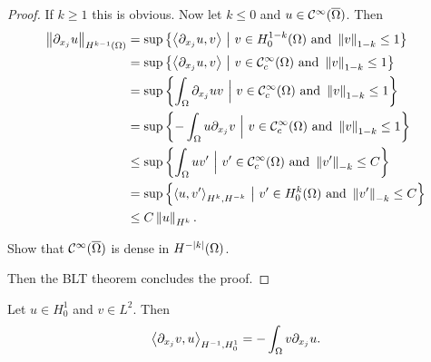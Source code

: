 \begin{proof}
  If $k\geq1$ this is obvious.
  Now let $k\leq0$ and $u\in\mathcal{C}^\infty(\overline\Omega)$.
  Then
  \begin{align*}
    \left\lVert \partial_{x_j}u \right\rVert_{H^{k-1}(\Omega)} &= \sup\left\{ {\left\langle \partial_{x_j}u,v \right\rangle} \ \big\vert \ v\in H_0^{1-k}(\Omega) \text{ and } \left\lVert v \right\rVert_{1-k} \leq 1 \right\} \\
    &= \sup\left\{ {\left\langle \partial_{x_j}u,v \right\rangle} \ \big\vert \ v\in \mathcal{C}_c^\infty(\Omega) \text{ and } \left\lVert v \right\rVert_{1-k} \leq 1 \right\} \\
    &= \sup\left\{ \int_\Omega \partial_{x_j}uv \ \Big\vert \ v\in \mathcal{C}_c^\infty(\Omega) \text{ and } \left\lVert v \right\rVert_{1-k} \leq 1 \right\} \\
    &= \sup\left\{ -\int_\Omega u\partial_{x_j}v \ \Big\vert \ v\in \mathcal{C}_c^\infty(\Omega) \text{ and } \left\lVert v \right\rVert_{1-k} \leq 1 \right\} \\
    &\leq \sup\left\{ \int_\Omega uv' \ \Big\vert \ v'\in \mathcal{C}_c^\infty(\Omega) \text{ and } \left\lVert v' \right\rVert_{-k} \leq C \right\} \\
    &= \sup\left\{ {\left\langle u,v' \right\rangle}_{H^k,H^{-k}} \ \big\vert \ v'\in H_0^k(\Omega) \text{ and } \left\lVert v' \right\rVert_{-k} \leq C \right\} \\
    &\leq C\left\lVert u \right\rVert_{H^k}.
  \end{align*}

  \begin{exer}
    Show that $\mathcal{C}^\infty(\overline\Omega)$ is dense in $H^{-\left\lvert k \right\rvert}(\Omega)$.
  \end{exer}
  Then the BLT theorem concludes the proof.
\end{proof}

\begin{exer}
  Let $u\in H_0^1$ and $v\in L^2$.
  Then
  \[ {\left\langle \partial_{x_j}v,u \right\rangle}_{H^{-1},H_0^1} = -\int_\Omega v\partial_{x_j}u .\]
\end{exer}
